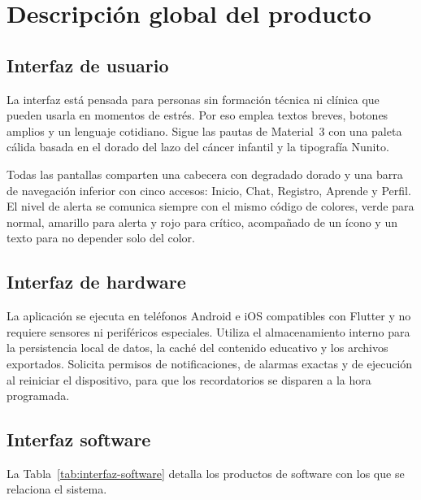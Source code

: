 \section[Descripción Global del Producto]{Descripción global del producto}

\subsection[Interfaz de Usuario]{Interfaz de usuario}

La interfaz está pensada para personas sin formación técnica ni clínica que
pueden usarla en momentos de estrés. Por eso emplea textos breves, botones
amplios y un lenguaje cotidiano. Sigue las pautas de Material~3 con una paleta
cálida basada en el dorado del lazo del cáncer infantil y la tipografía Nunito.

Todas las pantallas comparten una cabecera con degradado dorado y una barra de
navegación inferior con cinco accesos: Inicio, Chat, Registro, Aprende y
Perfil. El nivel de alerta se comunica siempre con el mismo código de colores,
verde para normal, amarillo para alerta y rojo para crítico, acompañado de un
ícono y un texto para no depender solo del color.

\subsection[Interfaz de Hardware]{Interfaz de hardware}

La aplicación se ejecuta en teléfonos Android e iOS compatibles con Flutter y no
requiere sensores ni periféricos especiales. Utiliza el almacenamiento interno
para la persistencia local de datos, la caché del contenido educativo y los
archivos exportados. Solicita permisos de notificaciones, de alarmas exactas y
de ejecución al reiniciar el dispositivo, para que los recordatorios se
disparen a la hora programada.

\subsection[Interfaz de Software]{Interfaz software}

La Tabla~\ref{tab:interfaz-software} detalla los productos de software con los
que se relaciona el sistema.

